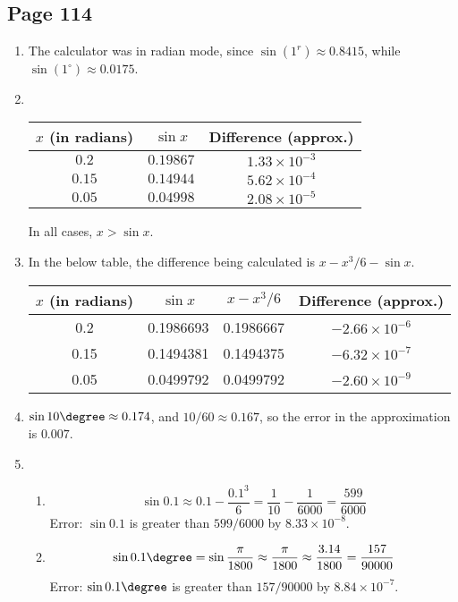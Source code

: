 \documentclass{article}
\newenvironment{solutions}[1]
{\subsection*{#1}
 \begin{enumerate}[leftmargin=1.5em]}
{\end{enumerate}}
\newcommand{\solution}{\item}
\newenvironment{subsolutions}
{\begin{enumerate}}
{\end{enumerate}}
\newcommand{\subsolution}{\item}
\begin{document}
\begin{solutions}{Page 114}
\solution %
The calculator was in radian mode, since $\sin (1^r) \approx  0.8415$, while $\sin (1^{\circ}) \approx 0.0175$.

\solution ~ %

\begin{center}
\bgroup
\def\arraystretch{1.3}
\setlength\tabcolsep{10pt}
\begin{tabular}{ |c|c|c| }
\hline
$x$ (in radians)
& $\sin{x}$
& Difference (approx.)\\
\hline
$0.2$
& $0.19867$
& $1.33 \times 10^{-3}$\\
\hline
$0.15$
& $0.14944$
& $5.62 \times 10^{-4}$\\
\hline
$0.05$
& $0.04998$
& $2.08 \times 10^{-5}$\\
\hline
\end{tabular}
\egroup
\end{center}

In all cases, $x > \sin x$.

\solution %
In the below table, the difference being calculated is $x-x^3/6 - \sin{x}$.

\begin{center}
\bgroup
\def\arraystretch{1.3}
\setlength\tabcolsep{10pt}
\begin{tabular}{|c|c|c|c|}
\hline
$x$ (in radians) & $\sin x$ & $x-x^3/6$ & Difference (approx.)\\
\hline
0.2 & 0.1986693 & 0.1986667 & $-2.66 \times 10^{-6}$\\
\hline
0.15 & 0.1494381 & 0.1494375 & $ -6.32 \times 10^{-7}$\\
\hline
0.05 & 0.0499792 & 0.0499792 & $-2.60 \times 10^{-9}$\\
\hline
\end{tabular}
\egroup
\end{center}

\solution %
$\sin 10\degree \approx 0.174$, and $10/60 \approx 0.167$, so the error in the approximation is $0.007$.

\solution %
\begin{subsolutions}
\subsolution %
\[
\sin{0.1} \approx 0.1 - \dfrac{0.1^{3}}{6} = \dfrac{1}{10} - \dfrac{1}{6000} = \dfrac{599}{6000}
\]
Error: $\sin{0.1}$ is greater than $599/6000$ by $8.33 \times 10^{-8}$.

\subsolution %
\[
\sin{0.1\degree} = \sin{\dfrac{\pi}{1800}} \approx  \dfrac{\pi}{1800} \approx \dfrac{3.14}{1800} = \dfrac{157}{90000}
\]
Error: $\sin{0.1\degree}$ is greater than $157/90000$ by $8.84 \times 10^{-7}$.
\end{subsolutions}


\end{solutions}
\end{document}

